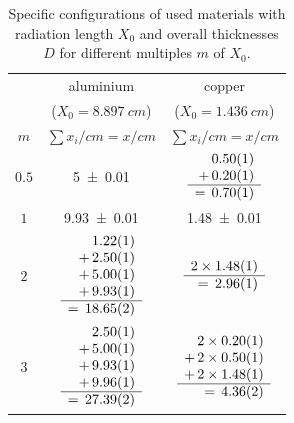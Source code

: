 \documentclass[sn-mathphys-num,iicol]{sn-jnl}
\theoremstyle{thmstyleone}
\theoremstyle{thmstyletwo}
\theoremstyle{thmstylethree}
\begin{document}
\begin{table}\centering
  \renewcommand*{\arraystretch}{1.15}
  \begin{tabular}{c|c|c}
    & aluminium & copper \\
    & {\fontsize{7}{5}\selectfont ($X_0=\SI{8.897}{cm}$)} & {\fontsize{7}{5}\selectfont ($X_0=\SI{1.436}{cm}$)} \\\hline
    $m$ & $\sum x_i/cm = x /cm$ & $\sum x_i/cm = x /cm$ \\\hline\hline\rule{0pt}{6ex}
    $0.5$ & \num{5\pm 0.01} & $\begin{array}{r}
                \num{0.5\pm 0.01} \\
                +\,\num{0.2\pm 0.01} \\\hline
                =\,\num{0.7\pm 0.01}    
              \end{array}$ \\\hline
    $1$ & \num{9.93\pm 0.01} & \num{1.48\pm 0.01} \\\hline
    $2$ & $\begin{array}{r}
      \num{1.22\pm 0.01} \\
      +\,\num{2.5\pm 0.01} \\
      +\,\num{5\pm 0.01} \\
      +\,\num{9.93\pm 0.01} \\\hline
      =\,\num{18.65\pm 0.02}
    \end{array}$ & $\begin{array}{r}
                      2\times\num{1.48\pm 0.01} \\\hline
                      =\,\num{2.96\pm 0.01}
                    \end{array}$ \\\hline
    $3$ & $\begin{array}{r}
      \num{2.5\pm 0.01} \\
      +\,\num{5\pm 0.01} \\
      +\,\num{9.93\pm 0.01} \\
      +\,\num{9.96\pm 0.01} \\\hline
      =\,\num{27.39\pm 0.02}
    \end{array}$ & $\begin{array}{r}
                      2\times\num{0.2\pm 0.01} \\
                      +\,2\times\num{0.5\pm 0.01} \\
                      +\,2\times\num{1.48\pm 0.01} \\\hline
                      =\,\num{4.36\pm 0.02}
                    \end{array}$ \\\hline
  \end{tabular}\vspace{3mm}
  \caption{Specific configurations of used materials with radiation length $X_0$ and overall thicknesses $D$ for different multiples $m$ of $X_0$.}
  \label{tab:config_materials}
\end{table}
\end{document}
